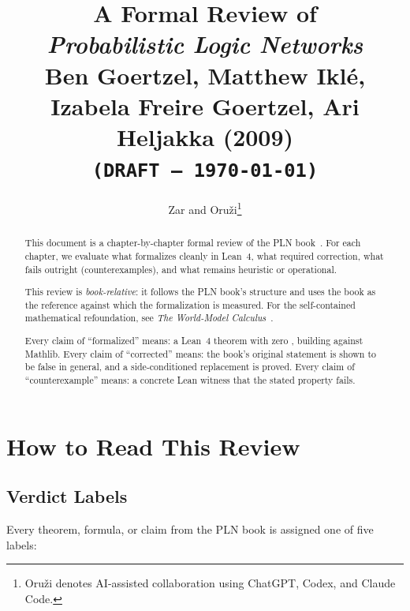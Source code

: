 \documentclass[11pt,openany]{report}
\title{A Formal Review of\\
  \emph{Probabilistic Logic Networks}\\[4pt]
  Ben Goertzel, Matthew Ikl\'{e}, Izabela Freire Goertzel, Ari Heljakka (2009)\\[12pt]
  \large\texttt{(DRAFT --- \today)}}
\author{Zar and Oru\v{z}i\thanks{%
  Oru\v{z}i denotes AI-assisted collaboration using ChatGPT, Codex, and Claude Code.}}
\date{}
\begin{document}
\maketitle

\begin{abstract}
This document is a chapter-by-chapter formal review of the PLN
book~\cite{goertzel2009pln}.  For each chapter, we evaluate what formalizes
cleanly in Lean~4, what required correction, what fails outright
(counterexamples), and what remains heuristic or operational.

This review is \emph{book-relative}: it follows the PLN book's structure
and uses the book as the reference against which the formalization is
measured.  For the self-contained mathematical refoundation, see
\emph{The World-Model Calculus}~\cite{xiPLN2026}.

Every claim of ``formalized'' means: a Lean~4 theorem with zero
, building against Mathlib.  Every claim of ``corrected''
means: the book's original statement is shown to be false in general,
and a side-conditioned replacement is proved.  Every claim of
``counterexample'' means: a concrete Lean witness that the stated property
fails.
\end{abstract}

\tableofcontents


\chapter{How to Read This Review}
\label{ch:methodology}

\section{Verdict Labels}

Every theorem, formula, or claim from the PLN book is assigned one of five
labels:
\end{document}

